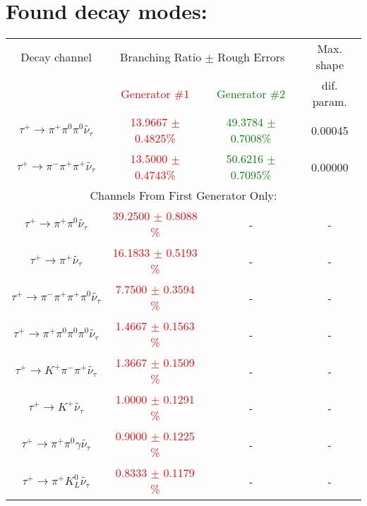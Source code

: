 \newpage

\section*{Found decay modes:}

\vspace{0.3cm} 
{\centering \begin{longtable}{|c|c|c|c|} 
\hline 
Decay channel &\multicolumn{2}{|c|}{ Branching Ratio $\pm$ Rough Errors} & Max. shape\\ 
      & \textcolor{red}{Generator \#1} & \textcolor{green}{Generator \#2} & dif. param.\\ 
\hline 
\hline 
 \hyperref[tau+ => pi+ pi0 pi0 nu_tautilda ]{$\tau^{+} \rightarrow \pi^{+} \pi^{0} \pi^{0} \widetilde{\nu_{\tau}} $} & \textcolor{red}{13.9667 $\pm$  0.4825\%} &\textcolor{green}{  49.3784 $\pm$  0.7008\%} & 0.00045 \\ 
\hline 
\hline 
 \hyperref[tau+ => pi- pi+ pi+ nu_tautilda ]{$\tau^{+} \rightarrow \pi^{-} \pi^{+} \pi^{+} \widetilde{\nu_{\tau}} $} & \textcolor{red}{13.5000 $\pm$  0.4743\%} &\textcolor{green}{  50.6216 $\pm$  0.7095\%} & 0.00000 \\ 
\hline 
\hline \multicolumn{4}{|c|}{ Channels From First Generator Only:} \\ 
\hline 
 $\tau^{+} \rightarrow \pi^{+} \pi^{0} \widetilde{\nu_{\tau}} $ & \textcolor{red}{39.2500  $\pm$   0.8088 \% }&  - & - \\ 
\hline 
 $\tau^{+} \rightarrow \pi^{+} \widetilde{\nu_{\tau}} $ & \textcolor{red}{16.1833  $\pm$   0.5193 \% }&  - & - \\ 
\hline 
 $\tau^{+} \rightarrow \pi^{-} \pi^{+} \pi^{+} \pi^{0} \widetilde{\nu_{\tau}} $ & \textcolor{red}{ 7.7500  $\pm$   0.3594 \% }&  - & - \\ 
\hline 
 $\tau^{+} \rightarrow \pi^{+} \pi^{0} \pi^{0} \pi^{0} \widetilde{\nu_{\tau}} $ & \textcolor{red}{ 1.4667  $\pm$   0.1563 \% }&  - & - \\ 
\hline 
 $\tau^{+} \rightarrow K^{+} \pi^{-} \pi^{+} \widetilde{\nu_{\tau}} $ & \textcolor{red}{ 1.3667  $\pm$   0.1509 \% }&  - & - \\ 
\hline 
 $\tau^{+} \rightarrow K^{+} \widetilde{\nu_{\tau}} $ & \textcolor{red}{ 1.0000  $\pm$   0.1291 \% }&  - & - \\ 
\hline 
 $\tau^{+} \rightarrow \pi^{+} \pi^{0} \gamma \widetilde{\nu_{\tau}} $ & \textcolor{red}{ 0.9000  $\pm$   0.1225 \% }&  - & - \\ 
\hline 
 $\tau^{+} \rightarrow \pi^{+} K_{L}^{0} \widetilde{\nu_{\tau}} $ & \textcolor{red}{ 0.8333  $\pm$   0.1179 \% }&  - & - \\ 

\end{longtable}}
